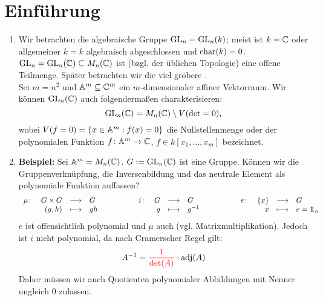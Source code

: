 \setcounter{section}{-1}
\section{Einführung}
\label{sec:para0}

\begin{enumerate}
	\item Wir betrachten die algebraische Gruppe $\operatorname{GL}_n = \operatorname{GL}_n(k)$; meist ist $k = \mathbb{C}$ oder allgemeiner $k = \overline{k}$ algebraisch abgeschlossen und $\operatorname{char}(k) = 0$. $\operatorname{GL}_n = \operatorname{GL}_n(\mathbb{C}) \subseteq M_n(\mathbb{C})$ ist (bzgl. der üblichen Topologie) eine offene Teilmenge. Später betrachten wir die viel gröbere . \\
	Sei $m = n^2$ und $\mathbb{A}^m \subseteq \mathbb{C}^m$ ein $m$-dimensionaler affiner Vektorraum. Wir können $\operatorname{GL}_n(\mathbb{C})$ auch folgendermaßen charakterisieren:
	\[ \operatorname{GL}_n(\mathbb{C}) = M_n(\mathbb{C}) \setminus V(\det = 0), \]
	wobei $V(f = 0) = \{x \in \mathbb{A}^m : f(x) = 0 \}$ die Nullstellenmenge oder  der polynomialen Funktion $f\colon \mathbb{A}^m \rightarrow \mathbb{C}$, $f \in k[x_1,\dots,x_m]$ bezeichnet.
	\item \textbf{Beispiel:} Sei $\mathbb{A}^m = M_n(\mathbb{C})$. $G := \operatorname{GL}_n(\mathbb{C})$ ist eine Gruppe. Können wir die Gruppenverknüpfung, die Inversenbildung und das neutrale Element als polynomiale Funktion auffassen? \setlength{\arraycolsep}{1pt}
	\[ \begin{array}{rrclcrrclcrrcl}
		\mu\colon & G \times G & \longrightarrow & G & \phantom{abstand} & i\colon & G & \longrightarrow & G & \phantom{abstand} & e\colon & \{x\} & \longrightarrow & G \\
		 & (g,h) & \longmapsto & gh & & & g & \longmapsto & g^{-1} & & & x & \longmapsto & e = \ind_n
	\end{array} \]
	$e$ ist offensichtlich polynomial und $\mu$ auch (vgl. Matrixmultiplikation). Jedoch ist $i$ nicht polynomial, da nach Cramerscher Regel gilt: \setlength{\arraycolsep}{3pt}
	\[ A^{-1} = \textcolor{red}{\frac{1}{\det(A)}} \cdot \operatorname{adj}(A) \]
	Daher müssen wir auch Quotienten polynomialer Abbildungen mit Nenner ungleich 0 zulassen.
\end{enumerate}

